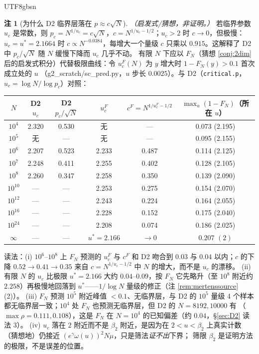 \documentclass[11pt,a4paper]{article}
\newcommand{\Haar}{\mu}
\theoremstyle{plain}
\theoremstyle{definition}
\newtheorem{rem}[prop]{注}
\begin{document}
\begin{CJK}{UTF8}{gbsn}
\begin{rem}[为什么 D2 临界层落在 $p\approx c\sqrt N$]\label{rem:ucrit}
\emph{（启发式/猜想，非证明。）} 若临界参数 $u_c$ 是常数，则 $p_c=N^{1/u_c}=c\sqrt N$，$c=N^{1/u_c-1/2}$；$u_c>2$ 时 $c\to0$，但极慢：
$u_c=u^*=2.1664$ 时 $c\propto N^{-0.0384}$，每增大一个量级 $c$ 只乘以 $0.915$。这解释了 D2 中 $p_c/\sqrt N$ 随 $N$ 缓慢下降而 $u_c$ 几乎不动。
有限 $N$ 下应以 $F_N$（猜想 \ref{conj:2dim} 后的启发式积分）代替极限曲线：令 $u_c^F(N)$ 为 $y$ 增大时 $1-F_N(y)>0.1$ 首次成立处的 $u$
（g2\_scratch/sc\_pred.py，$u$ 步长 $0.0025$）。与 D2（\texttt{critical.p}，$u_c=\log N/\log p_c$）对照：
\begin{center}
\small
\begin{tabular}{c|cc|ccc}
\hline
$N$ & D2 $u_c$ & D2 $p_c/\sqrt N$ & $u_c^F$ & $c^F=N^{1/u_c^F-1/2}$ & $\max_u(1-F_N)$（所在 $u$）\\
\hline
$10^4$ & 2.320 & 0.530 & 无 & — & 0.073 (2.195)\\
$10^5$ & 无 & — & 无 & — & 0.095 (2.155)\\
$10^6$ & 2.207 & 0.523 & 2.233 & 0.487 & 0.114 (2.125)\\
$10^7$ & 2.248 & 0.411 & 2.255 & 0.402 & 0.128 (2.105)\\
$10^8$ & 2.260 & 0.347 & 2.258 & 0.350 & 0.139 (2.090)\\
$10^{10}$ & — & — & 2.253 & 0.275 & 0.154 (2.070)\\
$10^{12}$ & — & — & 2.243 & 0.224 & 0.164 (2.055)\\
$10^{16}$ & — & — & 2.228 & 0.152 & 0.175 (2.040)\\
$10^{24}$ & — & — & 2.208 & 0.074 & 0.186 (2.025)\\
$\infty$ & — & — & $u^*=2.166$ & $\to0$ & $0.207$ $(2)$\\
\hline
\end{tabular}
\end{center}
读法：(i) $10^6$--$10^8$ 上 $F_N$ 预测的 $u_c^F$ 与 $c^F$ 和 D2 吻合到 $0.03$ 与 $0.04$ 以内；$c$ 的下降 $0.52\to0.41\to0.35$ 来自 $c=N^{1/u_c-1/2}$ 中 $N$ 的增大，而不是 $u_c$ 的漂移。
(ii) 有限 $N$ 的 $u_c$ 比极限 $u^*=2.166$ 大约 $0.04$--$0.09$，按 $F_N$ 它先略升（至 $10^8$ 附近约 $2.258$）再极慢地回落到 $u^*$——$1/\log N$ 量级的修正（注 \ref{rem:mertenssource}(2)）。
(iii) $F_N$ 预测 $10^5$ 附近峰值 $<0.1$、无临界层，与 D2 的 $10^5$ 量级 4 个样本都无临界层一致；$10^4$ 处 $F_N$ 也预测无临界层，但 D2 的 $N=8192,10000$ 有
（$\max\rho=0.111,0.108$），这是 $F_N$ 在 $N=10^4$ 的已知偏差（约 $0.04$，\S\ref{sec:D2} 读法 3）。
(iv) $u_c$ 落在 $2$ 附近而不是 $\beta_2$ 附近，是因为在 $2<u<\beta_2$ 上真实计数（猜想地）仍接近 $(e^\gamma\omega(u))^2N\Haar$，只是筛法\emph{证不出}下界；
筛限 $\beta_2$ 是证明方法的极限，不是误差的位置。
\end{rem}


\end{CJK}
\end{document}
